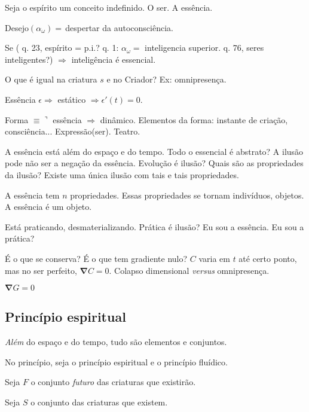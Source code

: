 \documentclass[12pt,a4paper]{article}
\begin{document}
			Seja o esp\'irito um conceito indefinido. O ser. A ess\^encia.

			Desejo$(\alpha_\omega) = $\,despertar da autoconsci\^encia.

			Se (\cite{le} q. 23, esp\'irito = p.i.? \cite{le} q. 1: $\alpha_\omega = $ inteligencia superior. \cite{le} q. 76, seres inteligentes?) $\Rightarrow$ intelig\^encia \'e essencial.

			O que \'e igual na criatura $s$ e no Criador? Ex: omnipresen\c{c}a.

			Ess\^encia $\epsilon \Rightarrow$ est\'atico $\Rightarrow \epsilon'(t) = 0$.

			Forma $\equiv \urcorner$ ess\^encia $\Rightarrow$ din\^amico. Elementos da forma: instante de cria\c{c}\~ao, consci\^encia... Express\~ao(ser). Teatro.

			A ess\^encia est\'a al\'em do espa\c{c}o e do tempo. Todo o essencial \'e abstrato? A ilus\~ao pode n\~ao ser a nega\c{c}\~ao da ess\^encia. Evolu\c{c}\~ao \'e ilus\~ao? Quais s\~ao as propriedades da ilus\~ao? Existe uma \'unica ilus\~ao com tais e tais propriedades.

			A ess\^encia tem $n$ propriedades. Essas propriedades se tornam indiv\'iduos, objetos. A ess\^encia \'e um objeto.

			Est\'a praticando, desmaterializando. Pr\'atica \'e ilus\~ao? Eu sou a ess\^encia. Eu sou a pr\'atica?

			\'E o que se conserva? \'E o que tem gradiente nulo? $C$ varia em $t$ at\'e certo ponto, mas no ser perfeito, $\mathbf{\nabla} C = 0$. Colapso dimensional \emph{versus} omnipresen\c{c}a.

			$\mathbf{\nabla} G = 0$

		\subsection{Princ\'ipio espiritual}

			\begin{flushright}
			\end{flushright}

			\emph{Al\'em} do espa\c{c}o e do tempo, tudo s\~ao elementos e conjuntos.

			No princ\'ipio, seja o princ\'ipio espiritual e o princ\'ipio flu\'idico.

			Seja $F$ o conjunto \emph{futuro} das criaturas que existir\~ao.

			Seja $S$ o conjunto das criaturas que existem.
\end{document}
